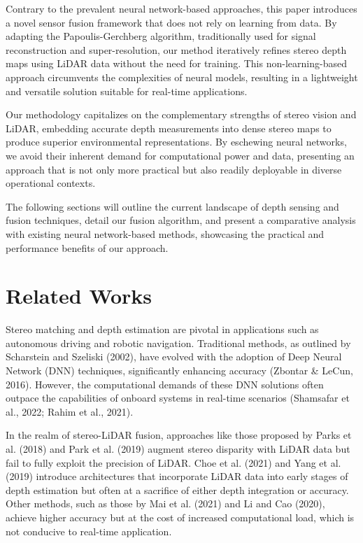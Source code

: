 \documentclass[conference]{IEEEtran}
\begin{document}
Contrary to the prevalent neural network-based approaches, this paper introduces a novel sensor fusion framework that does not rely on learning from data. By adapting the Papoulis-Gerchberg algorithm, traditionally used for signal reconstruction and super-resolution, our method iteratively refines stereo depth maps using LiDAR data without the need for training. This non-learning-based approach circumvents the complexities of neural models, resulting in a lightweight and versatile solution suitable for real-time applications.

Our methodology capitalizes on the complementary strengths of stereo vision and LiDAR, embedding accurate depth measurements into dense stereo maps to produce superior environmental representations. By eschewing neural networks, we avoid their inherent demand for computational power and data, presenting an approach that is not only more practical but also readily deployable in diverse operational contexts.

The following sections will outline the current landscape of depth sensing and fusion techniques, detail our fusion algorithm, and present a comparative analysis with existing neural network-based methods, showcasing the practical and performance benefits of our approach.

\section{Related Works}

Stereo matching and depth estimation are pivotal in applications such as autonomous driving and robotic navigation. Traditional methods, as outlined by Scharstein and Szeliski (2002), have evolved with the adoption of Deep Neural Network (DNN) techniques, significantly enhancing accuracy (Zbontar \& LeCun, 2016). However, the computational demands of these DNN solutions often outpace the capabilities of onboard systems in real-time scenarios (Shamsafar et al., 2022; Rahim et al., 2021).

In the realm of stereo-LiDAR fusion, approaches like those proposed by Parks et al. (2018) and Park et al. (2019) augment stereo disparity with LiDAR data but fail to fully exploit the precision of LiDAR. Choe et al. (2021) and Yang et al. (2019) introduce architectures that incorporate LiDAR data into early stages of depth estimation but often at a sacrifice of either depth integration or accuracy. Other methods, such as those by Mai et al. (2021) and Li and Cao (2020), achieve higher accuracy but at the cost of increased computational load, which is not conducive to real-time application.
\end{document}

